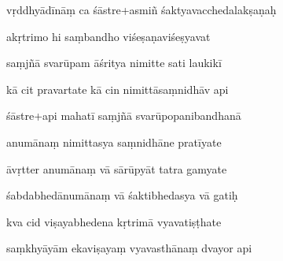 \documentclass[article,12pt,a4paper]{memoir}%
\newcounter{parCount}
\begin{document}
	  
	  \pstart {} vṛddhyādīnāṃ ca śāstre+asmiñ   śaktyavacchedalakṣaṇaḥ 
	{}
	\pend%
      

	  
	  \pstart \leavevmode%
	akṛtrimo hi saṃbandho viśeṣaṇaviśeṣyavat 
	{}
	\pend%
      

	  
	  \pstart {} saṃjñā svarūpam āśritya nimitte sati laukikī 
	{}
	\pend%
      

	  
	  \pstart \leavevmode%
	kā cit pravartate kā cin nimittāsaṃnidhāv api 
	{}
	\pend%
      

	  
	  \pstart {} śāstre+api mahatī saṃjñā svarūpopanibandhanā 
	{}
	\pend%
      

	  
	  \pstart \leavevmode%
	anumānaṃ nimittasya saṃnidhāne pratīyate 
	{}
	\pend%
      

	  
	  \pstart {} āvṛtter anumānaṃ vā sārūpyāt tatra gamyate 
	{}
	\pend%
      

	  
	  \pstart \leavevmode%
	śabdabhedānumānaṃ vā śaktibhedasya vā gatiḥ 
	{}
	\pend%
      

	  
	  \pstart {} kva cid viṣayabhedena kṛtrimā vyavatiṣṭhate 
	{}
	\pend%
      

	  
	  \pstart \leavevmode%
	saṃkhyāyām ekaviṣayaṃ vyavasthānaṃ dvayor api 
	{}
	\pend%
      
\end{document}
